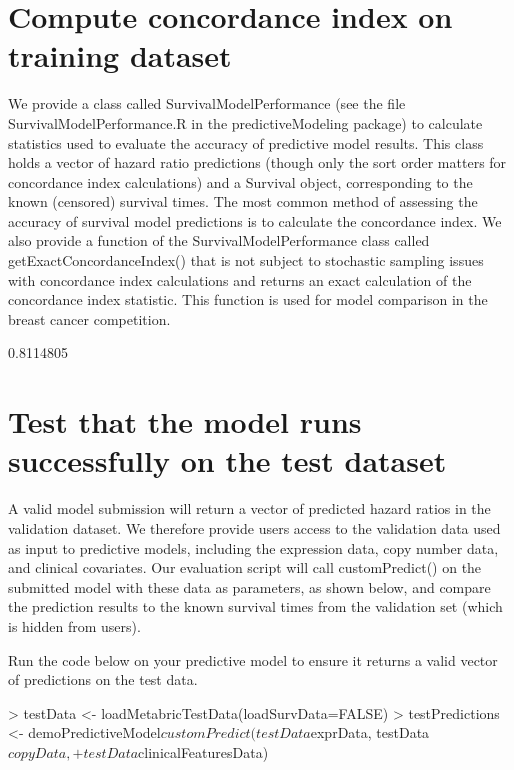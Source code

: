 \documentclass[10pt]{article}
\begin{document}
\section{Compute concordance index on training dataset}
We provide a class called SurvivalModelPerformance (see the file SurvivalModelPerformance.R in the predictiveModeling package) to calculate statistics used to evaluate the accuracy of predictive model results. This class holds a vector of hazard ratio predictions (though only the sort order matters for concordance index calculations) and a Survival object, corresponding to the known (censored) survival times. The most common method of assessing the accuracy of survival model predictions is to calculate the concordance index. We also provide a function of the SurvivalModelPerformance class called getExactConcordanceIndex() that is not subject to stochastic sampling issues with concordance index calculations and returns an exact calculation of the concordance index statistic. This function is used for model comparison in the breast cancer competition.
\begin{Schunk}
\begin{Soutput}
[1] 0.8114805
\end{Soutput}
\end{Schunk}

\section{Test that the model runs successfully on the test dataset}
A valid model submission will return a vector of predicted hazard ratios in the validation dataset. We therefore provide users access to the validation data used as input to predictive models, including the expression data, copy number data, and clinical covariates. Our evaluation script will call customPredict() on the submitted model with these data as parameters, as shown below, and compare the prediction results to the known survival times from the validation set (which is hidden from users).

Run the code below on your predictive model to ensure it returns a valid vector of predictions on the test data.

\begin{Schunk}
\begin{Sinput}
> testData <- loadMetabricTestData(loadSurvData=FALSE)
> testPredictions <- demoPredictiveModel$customPredict(testData$exprData, testData$copyData,
+                                                      testData$clinicalFeaturesData)
\end{Sinput}
\end{Schunk}
\end{document}
